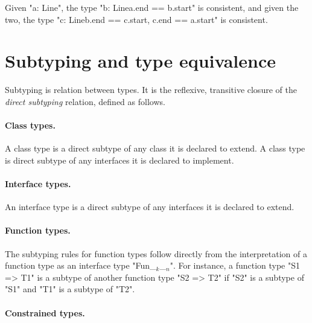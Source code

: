 Given \xcd"a: Line", the type \xcd"b: Line{a.end == b.start}" is consistent,
and
given the two, the type \xcd"c: Line{b.end == c.start, c.end == a.start}"
is consistent.


\section{Subtyping and type equivalence}\label{DepType:Equivalence}\label{deptype,equivalence}

Subtyping is relation between types.  It is the
reflexive, transitive 
closure of the {\em direct subtyping} relation, defined as
follows.

\paragraph{Class types.}  A class type is a direct subtype of
any
class it is declared to extend.  A class type is direct subtype
of any interfaces it is declared to implement.

\paragraph{Interface types.}  An interface type is a direct
subtype of any interfaces it is declared to extend.

\paragraph{Function types.}

The subtyping rules for function types follow directly from the
interpretation of a function type as an interface type
\xcdmath"Fun_$_k$_$_n$".
For instance,
a function type
\xcd"S1 => T1" 
is a subtype of another function type
\xcd"S2 => T2" 
if \xcd"S2" is a subtype of \xcd"S1"
and \xcd"T1" is a subtype of \xcd"T2".

\paragraph{Constrained types.}

